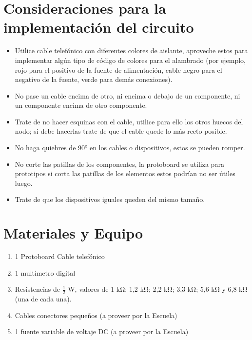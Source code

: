 \documentclass{report}
\begin{document}
\section{Consideraciones para la implementación del circuito}
\begin{itemize}
\item Utilice cable telefónico con diferentes colores de aislante, aproveche estos
para implementar algún tipo de código de colores para el alambrado (por
ejemplo, rojo para el positivo de la fuente de alimentación, cable negro para
el negativo de la fuente, verde para demás conexiones).
\item No pase un cable encima de otro, ni encima o debajo de un componente, ni
un componente encima de otro componente.
\item Trate de no hacer esquinas con el cable, utilice para ello los otros huecos del
nodo; si debe hacerlas trate de que el cable quede lo más recto posible.
\item No haga quiebres de 90\si{\degree} en los cables o dispositivos, estos se pueden romper.
\item No corte las patillas de los componentes, la protoboard se utiliza
para prototipos si corta las patillas de los elementos estos podrían no ser
útiles luego.
\item Trate de que los dispositivos iguales queden del mismo tamaño.
\end{itemize}

\section{Materiales y Equipo}
\begin{enumerate}
\item 1 Protoboard
Cable telefónico
\item 1 multímetro digital
\item Resistencias de $\frac{1}{2}$ \si{\watt}, valores de 1 \si{\kilo\ohm}; 1,2 \si{\kilo\ohm}; 2,2 \si{\kilo\ohm}; 3,3 \si{\kilo\ohm}; 5,6 \si{\kilo\ohm} y 6,8 \si{\kilo\ohm} (una de cada una).
\item Cables conectores pequeños (a proveer por la Escuela)
\item 1 fuente variable de voltaje DC (a proveer por la Escuela)
\end{enumerate}
\end{document}
